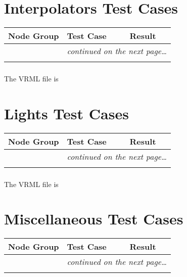 \documentclass[12pt,letterpaper]{article}
\newcounter{testCaseCtr}
\newcommand{\resetTestCase}{\setcounter{testCaseCtr}{1}}
\begin{document}
\section{Interpolators Test Cases}
\resetTestCase


\begin{center}
\setlongtables
\begin{longtable}{|l|l|l|}
\hline
\textbf{Node Group} & \textbf{Test Case} & \textbf{Result} \\
\hline\hline
\endhead
\cline{2-3}
 & \multicolumn{2}{|r|}{\textsl{continued on the next page\ldots}} \\
\hline
\endfoot
\hline
\endlastfoot
& & \\
\cline{2-3}
\end{longtable}
\end{center}

\subsubsection{}
The VRML file is 

\section{Lights Test Cases}
\resetTestCase


\begin{center}
\setlongtables
\begin{longtable}{|l|l|l|}
\hline
\textbf{Node Group} & \textbf{Test Case} & \textbf{Result} \\
\hline\hline
\endhead
\cline{2-3}
 & \multicolumn{2}{|r|}{\textsl{continued on the next page\ldots}} \\
\hline
\endfoot
\hline
\endlastfoot
& & \\
\cline{2-3}
\end{longtable}
\end{center}

\subsubsection{}
The VRML file is 

\section{Miscellaneous Test Cases}
\resetTestCase


\begin{center}
\setlongtables
\begin{longtable}{|l|l|l|}
\hline
\textbf{Node Group} & \textbf{Test Case} & \textbf{Result} \\
\hline\hline
\endhead
\cline{2-3}
 & \multicolumn{2}{|r|}{\textsl{continued on the next page\ldots}} \\
\hline
\endfoot
\hline
\endlastfoot
& & \\
\cline{2-3}
\end{longtable}
\end{center}
\end{document}
